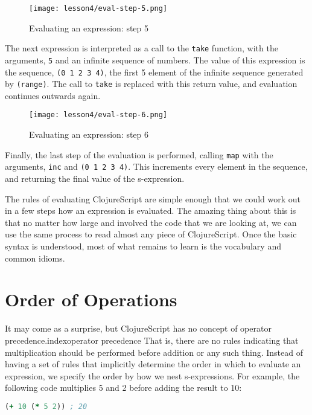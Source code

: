 \documentclass[10pt,twoside,openright]{memoir}
\begin{document}
\begin{figure}[H]
\caption{Evaluating an expression: step 5}
\centering
\texttt{[image: lesson4/eval-step-5.png]}
\end{figure}

The next expression is interpreted as a call to the \texttt{take}
function, with the arguments, \texttt{5} and an infinite sequence of
numbers. The value of this expression is the sequence,
\texttt{(0\ 1\ 2\ 3\ 4)}, the first 5 element of the infinite sequence
generated by \texttt{(range)}. The call to \texttt{take} is replaced
with this return value, and evaluation continues outwards again.

\begin{figure}[H]
\caption{Evaluating an expression: step 6}
\centering
\texttt{[image: lesson4/eval-step-6.png]}
\end{figure}

Finally, the last step of the evaluation is performed, calling
\texttt{map} with the arguments, \texttt{inc} and
\texttt{(0\ 1\ 2\ 3\ 4)}. This increments every element in the sequence,
and returning the final value of the s-expression.

The rules of evaluating ClojureScript are simple enough that we could
work out in a few steps how an expression is evaluated. The amazing
thing about this is that no matter how large and involved the code that
we are looking at, we can use the same process to read almost any piece
of ClojureScript. Once the basic syntax is understood, most of what
remains to learn is the vocabulary and common idioms.

\section{Order of Operations}

It may come as a surprise, but ClojureScript has no concept of operator
precedence.index{operator precedence} That is, there are no rules indicating that multiplication
should be performed before addition or any such thing. Instead of having
a set of rules that implicitly determine the order in which to evaluate
an expression, we specify the order by how we nest s-expressions. For
example, the following code multiplies 5 and 2 before adding the result
to 10:

\begin{lstlisting}[language=Clojure, caption={Multiply then add}]
(+ 10 (* 5 2)) ; 20
\end{lstlisting}
\end{document}
